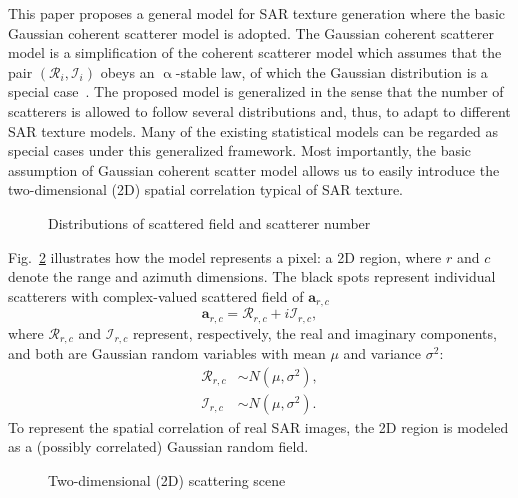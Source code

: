 \documentclass[journal]{IEEEtran}
\begin{document}
This paper proposes a general model for SAR texture generation where the basic Gaussian coherent scatterer model is adopted.
The Gaussian coherent scatterer model is a simplification
of the coherent scatterer model which assumes that the pair $(\mathcal{R}_{i} , \mathcal{I}_{i})$ obeys an
$\upalpha$-stable law, of which the Gaussian distribution is a special case~\cite{SimulationPropertiesStableLaw}.
The proposed model is generalized in the sense that the number of scatterers is allowed to follow several distributions and, thus, to adapt to different SAR texture models.
Many of the existing statistical models can be regarded as special cases under this generalized framework.
Most importantly, the basic assumption of Gaussian coherent scatter model allows us to easily introduce the two-dimensional (2D) spatial correlation typical of SAR texture.

\begin{figure}[hbt]
\centering
\caption{Distributions of scattered field and scatterer number}
\label{Figure1-Distributions}
\end{figure}

Fig.~\ref{Figure2-ScatteringScene} illustrates how the model represents a pixel: a 2D region, where $r$ and $c$ denote the range and azimuth dimensions.
The black spots represent individual scatterers with complex-valued scattered field of $\boldsymbol{a}_{r,c}$
\begin{equation}
\boldsymbol{a}_{r, c}=\mathcal{R}_{r, c}+i \mathcal{I}_{r, c} ,
\label{eq2:ScatteredField}
\end{equation}
where $\mathcal{R}_{r, c}$ and $\mathcal{I}_{r, c}$ represent, respectively, the real and imaginary components, and both are Gaussian random variables with mean $\mu$ and variance $\sigma^2$:
\begin{equation}
\begin{split}
\mathcal{R}_{r, c} & \sim N\left(\mu, \sigma^{2}\right), \\
\mathcal{I}_{r, c} & \sim N\left(\mu, \sigma^{2}\right).
\label{eq3:Gaussian}
\end{split}
\end{equation}
To represent the spatial correlation of real SAR images, the 2D region is modeled as a (possibly correlated) Gaussian random field.

\begin{figure}[hbt]
\centering
\caption{Two-dimensional (2D) scattering scene}
\label{Figure2-ScatteringScene}
\end{figure}
\end{document}
